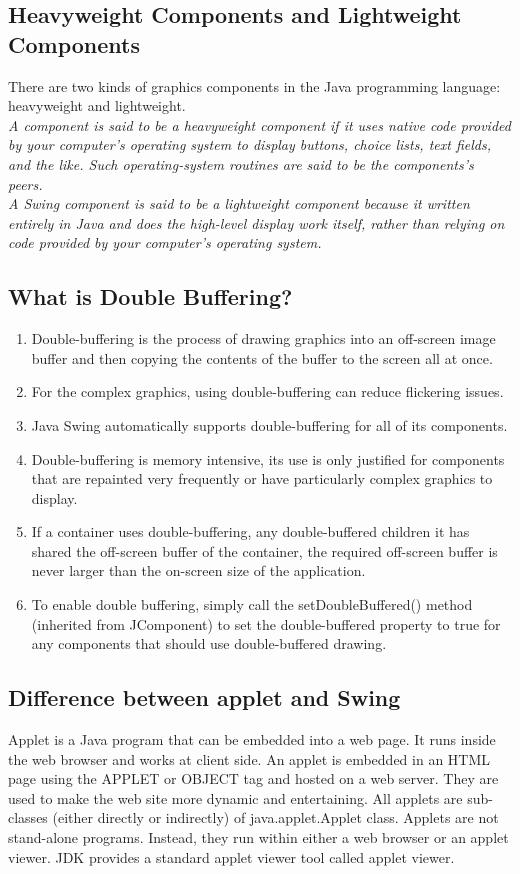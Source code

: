 \documentclass[11pt]{article}
\begin{document}
\subsection{Heavyweight Components and Lightweight Components}
There are two kinds of graphics components in the Java programming language: heavyweight and lightweight.\\

\textit{A component is said to be a heavyweight component if it uses native code provided by your computer's operating system to display buttons, choice lists, text fields, and the like. Such operating-system routines are said to be the components's peers.}\\

\textit{A Swing component is said to be a lightweight component because it written entirely in Java and does the high-level display work itself, rather than relying on code provided by your computer's operating system.}

\subsection{What is Double Buffering?}
\begin{enumerate}
	\item Double-buffering is the process of drawing graphics into an off-screen image buffer and then copying the contents of the buffer to the screen all at once.
	\item For the complex graphics, using double-buffering can reduce flickering issues.
	\item Java Swing automatically supports double-buffering for all of its components.
	\item Double-buffering is memory intensive, its use is only justified for components that are repainted very frequently or have particularly complex graphics to display.
	\item If a container uses double-buffering, any double-buffered children it has shared the off-screen buffer of the container, the required off-screen buffer is never larger than the on-screen size of the application.
	\item To enable double buffering, simply call the setDoubleBuffered() method (inherited from JComponent) to set the double-buffered property to true for any components that should use double-buffered drawing.
\end{enumerate}
\subsection{Difference between applet and Swing}
Applet is a Java program that can be embedded into a web page. It runs inside the web browser and works at client side. An applet is embedded in an HTML page using the APPLET or OBJECT tag and hosted on a web server.
They are used to make the web site more dynamic and entertaining. All applets are sub-classes (either directly or indirectly) of java.applet.Applet class. Applets are not stand-alone programs. Instead, they run within either a web browser or an applet viewer. JDK provides a standard applet viewer tool called applet viewer. \\
\end{document}
